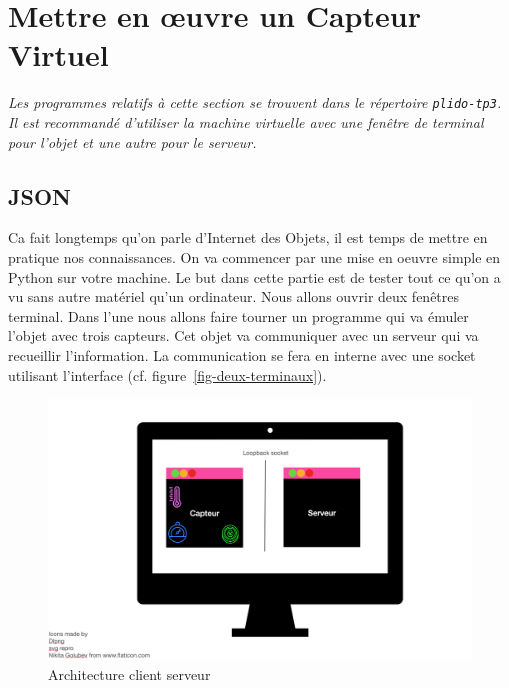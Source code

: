 \chapter{Mettre en œuvre un Capteur Virtuel}

\textit{Les programmes relatifs à cette section se trouvent dans le répertoire \texttt{plido-tp3}. Il est recommandé d'utiliser la machine virtuelle avec une fenêtre de terminal pour l'objet et une autre pour le serveur.}

\section {JSON}

\begin{figure}
\end{figure}

Ca fait longtemps qu'on parle d'Internet des Objets, il est temps de mettre en pratique nos connaissances. On va commencer par une mise en oeuvre simple en Python sur votre machine. Le but dans cette partie est de tester tout ce qu'on a vu sans autre matériel qu'un ordinateur. Nous allons ouvrir deux fenêtres terminal. Dans l'une nous allons faire tourner un programme qui va émuler l'objet avec trois capteurs. Cet objet va communiquer avec un serveur qui va recueillir l'information. La communication se fera en interne avec une socket utilisant l'interface  (cf. figure~\vref{fig-deux-terminaux}).


\begin{figure}[tbp]
\centerline{\includegraphics[width=1\columnwidth]{Pictures/Capture24.png}}
\caption{Architecture client serveur}
\label{fig-deux-terminaux}
\end{figure}

